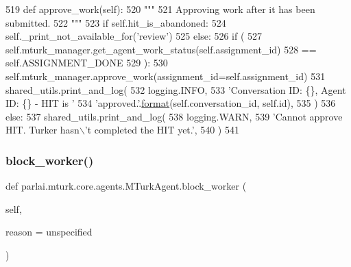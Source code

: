 \begin{DoxyCode}
519     \textcolor{keyword}{def }approve\_work(self):
520         \textcolor{stringliteral}{"""}
521 \textcolor{stringliteral}{        Approving work after it has been submitted.}
522 \textcolor{stringliteral}{        """}
523         \textcolor{keywordflow}{if} self.hit\_is\_abandoned:
524             self.\_print\_not\_available\_for(\textcolor{stringliteral}{'review'})
525         \textcolor{keywordflow}{else}:
526             \textcolor{keywordflow}{if} (
527                 self.mturk\_manager.get\_agent\_work\_status(self.assignment\_id)
528                 == self.ASSIGNMENT\_DONE
529             ):
530                 self.mturk\_manager.approve\_work(assignment\_id=self.assignment\_id)
531                 shared\_utils.print\_and\_log(
532                     logging.INFO,
533                     \textcolor{stringliteral}{'Conversation ID: \{\}, Agent ID: \{\} - HIT is '}
534                     \textcolor{stringliteral}{'approved.'}.\hyperlink{namespaceparlai_1_1chat__service_1_1services_1_1messenger_1_1shared__utils_a32e2e2022b824fbaf80c747160b52a76}{format}(self.conversation\_id, self.id),
535                 )
536             \textcolor{keywordflow}{else}:
537                 shared\_utils.print\_and\_log(
538                     logging.WARN,
539                     \textcolor{stringliteral}{'Cannot approve HIT. Turker hasn\(\backslash\)'t completed the HIT yet.'},
540                 )
541 
\end{DoxyCode}
\mbox{\label{classparlai_1_1mturk_1_1core_1_1agents_1_1MTurkAgent_a3c836286ed2f5fedce11c410a437208c}} 
\subsubsection{\texorpdfstring{block\+\_\+worker()}{block\_worker()}}
{\footnotesize\ttfamily def parlai.\+mturk.\+core.\+agents.\+M\+Turk\+Agent.\+block\+\_\+worker (\begin{DoxyParamCaption}\item[{}]{self,  }\item[{}]{reason = {\ttfamily \textquotesingle{}unspecified\textquotesingle{}} }\end{DoxyParamCaption})}

